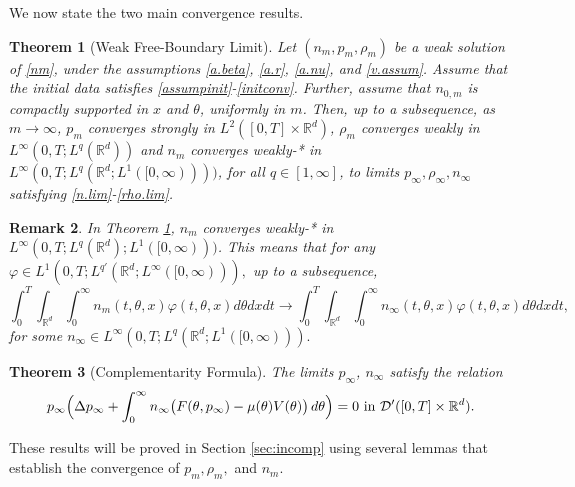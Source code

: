 \documentclass{amsart}
\newtheorem{theorem}{Theorem}[section]
\newtheorem{remark}[theorem]{Remark}
\def\R{\mathbb R}
\begin{document}
We now state the two main convergence results.
\begin{theorem}[Weak Free-Boundary Limit]\label{prop.conv}
    Let $(n_m,p_m,\rho_m)$ be a weak solution of \eqref{nm}, under the assumptions \eqref{a.beta}, \eqref{a.r}, \eqref{a.nu}, and \eqref{v.assum}. Assume that the initial data satisfies \eqref{assumpinit}-\eqref{initconv}. Further, assume that $n_{0,m}$ is compactly supported in $x$ and $\theta$, uniformly in $m$. Then, up to a subsequence, as $m \rightarrow \infty$, $p_m$ converges strongly in $L^2([0,T]\times \R^d)$, $\rho_m$ converges weakly in $L^\infty(0,T;L^q(\R^d))$ and $n_m$ converges weakly-* in $L^\infty(0,T;L^q(\R^d;L^1([0,\infty))))$, for all $q \in [1,\infty]$, to limits $p_\infty,\rho_\infty,n_\infty$ satisfying \eqref{n.lim}-\eqref{rho.lim}.
 \end{theorem}
 \begin{remark}\label{weakstar} In Theorem \ref{prop.conv}, $n_m$ converges weakly-* in $L^\infty(0,T;L^q(\R^d);L^1([0,\infty)))$. This means that for any $\varphi \in L^1(0,T;L^{q'}(\R^d;L^\infty([0,\infty))),$ up to a subsequence,
    $$
    \int_{0}^{T}\int_{\R^d}\int_{0}^{\infty}n_m(t,\theta,x)\varphi(t,\theta,x)d\theta dx dt \rightarrow \int_{0}^{T}\int_{\R^d}\int_{0}^{\infty}n_\infty(t,\theta,x)\varphi(t,\theta,x)d\theta dx dt,
    $$
    for some $n_\infty \in L^\infty(0,T;L^{q}(\R^d;L^1([0,\infty))).$
    \end{remark}
 \begin{theorem}[Complementarity Formula]\label{complement}
     The limits $p_\infty$, $n_\infty$ satisfy the relation
     \begin{equation}\label{comp}
        p_\infty\Bigl(\Delta p_\infty+\int_{0}^{\infty}n_\infty\bigl(F(\theta,p_\infty)-\mu(\theta)V(\theta)\bigr)\,d\theta \Bigr)=0 \text{ in } \mathcal{D}'([0,T]\times \R^d).
     \end{equation}
 \end{theorem}
 These results will be proved in Section \ref{sec:incomp} using several lemmas that establish the convergence of $p_m, \rho_m,$ and $n_m$.
 
\end{document}
